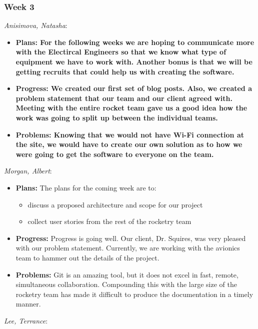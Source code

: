 \documentclass[10pt,draftclsnofoot,onecolumn]{IEEEtran}
\newcommand{\subsubsubsection}[1]{
	\hfill\break\textit{#1}:
}
\begin{document}
\subsubsection{Week 3}
\subsubsubsection{Anisimova, Natasha}
\begin{itemize}
	\item \textbf{Plans: For the following weeks we are hoping to communicate more with the Electircal Engineers so that
		we know what type of equipment we have to work with. Another bonus is that we will be getting recruits that could
		help us with creating the software.}
	\item \textbf{Progress: We created our first set of blog posts. Also, we created a problem statement that our team
		and our client agreed with. Meeting with the entire rocket team gave us a good idea how the work was going to split up
		between the individual teams. }
	\item \textbf{Problems: Knowing that we would not have Wi-Fi connection at the site, we would have to create our own
		solution as to how we were going to get the software to everyone on the team.}
\end{itemize}
\subsubsubsection{Morgan, Albert}
\begin{itemize}
	\item \textbf{Plans: }
	The plans for the coming week are to:
	\begin{itemize}
		\item discuss a proposed architecture and scope for our project
		\item collect user stories from the rest of the rocketry team
	\end{itemize}
	\item \textbf{Progress: }
	Progress is going well. Our client, Dr. Squires, was very pleased with our problem statement. Currently, we are working with the avionics team to hammer out the details of the project.
	\item \textbf{Problems: }
	Git is an amazing tool, but it does not excel in fast, remote, simultaneous collaboration. Compounding this with the large size of the rocketry team has made it difficult to produce the documentation in a timely manner.
\end{itemize}
\subsubsubsection{Lee, Terrance}
\end{document}

